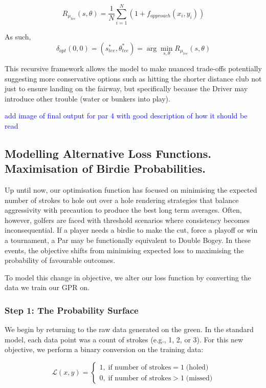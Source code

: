 \documentclass[11pt, letterpaper]{article}
\begin{document}
$$R_{\mu_{tee}}(s, \theta) = \frac{1}{N} \sum^N_{i =1} (1 + f_{approach}(x_i, y_i))$$

As such,
$$\delta_{opt} (0, 0) = (s^*_{tee}, \theta^*_{tee}) = \arg \min_{s, \theta} R_{\mu_{tee}}(s, \theta)$$

This recursive framework allows the model to make nuanced trade-offs potentially suggesting more conservative options such as hitting the shorter distance club not just to ensure landing on the fairway, but specifically because the Driver may introduce other trouble (water or bunkers into play).

\textcolor{blue}{add image of final output for par 4 with good description of how it should be read}

\subsection{Modelling Alternative Loss Functions. Maximisation of Birdie Probabilities.}

Up until now, our optimisation function has focused on minimising the expected number of strokes to hole out over a hole rendering strategies that balance aggressivity with precaution to produce the best long term averages. Often, however, golfers are faced with threshold scenarios where consistency becomes inconsequential. If a player needs a birdie to make the cut, force a playoff or win a tournament, a Par may be functionally equivalent to Double Bogey. In these events, the objective shifts from minimising expected loss to maximising the probability of favourable outcomes.

To model this change in objective, we alter our loss function by converting the data we train our GPR on.

\subsubsection{Step 1: The Probability Surface}
We begin by returning to the raw data generated on the green. In the standard model, each data point was a count of strokes (e.g., 1, 2, or 3). For this new objective, we perform a binary conversion on the training data:

\[
\mathcal{L}(x,y) = \begin{cases}
1, \; \text{if number of strokes} = 1  \;\text{(holed)}\\
    0, \; \text{if number of strokes} > 1  \;\text{(missed)}
\end{cases}
\]
\end{document}
